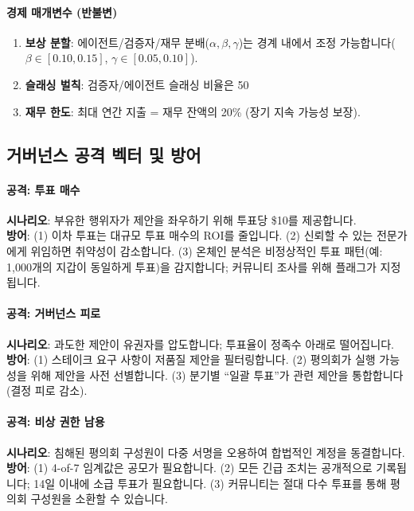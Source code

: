 \documentclass[11pt]{article}
\begin{document}
\paragraph{경제 매개변수 (반불변)}
\begin{enumerate}[noitemsep]
  \item \textbf{보상 분할}: 에이전트/검증자/재무 분배($\alpha, \beta, \gamma$)는 경계 내에서 조정 가능합니다($\beta \in [0.10, 0.15]$, $\gamma \in [0.05, 0.10]$).
  \item \textbf{슬래싱 벌칙}: 검증자/에이전트 슬래싱 비율은 50%
  \item \textbf{재무 한도}: 최대 연간 지출 = 재무 잔액의 20\% (장기 지속 가능성 보장).
\end{enumerate}

\subsection{거버넌스 공격 벡터 및 방어}

\paragraph{공격: 투표 매수}
\textbf{시나리오}: 부유한 행위자가 제안을 좌우하기 위해 투표당 \$10를 제공합니다.\\
\textbf{방어}: (1) 이차 투표는 대규모 투표 매수의 ROI를 줄입니다. (2) 신뢰할 수 있는 전문가에게 위임하면 취약성이 감소합니다. (3) 온체인 분석은 비정상적인 투표 패턴(예: 1,000개의 지갑이 동일하게 투표)을 감지합니다; 커뮤니티 조사를 위해 플래그가 지정됩니다.

\paragraph{공격: 거버넌스 피로}
\textbf{시나리오}: 과도한 제안이 유권자를 압도합니다; 투표율이 정족수 아래로 떨어집니다.\\
\textbf{방어}: (1) 스테이크 요구 사항이 저품질 제안을 필터링합니다. (2) 평의회가 실행 가능성을 위해 제안을 사전 선별합니다. (3) 분기별 ``일괄 투표''가 관련 제안을 통합합니다(결정 피로 감소).

\paragraph{공격: 비상 권한 남용}
\textbf{시나리오}: 침해된 평의회 구성원이 다중 서명을 오용하여 합법적인 계정을 동결합니다.\\
\textbf{방어}: (1) 4-of-7 임계값은 공모가 필요합니다. (2) 모든 긴급 조치는 공개적으로 기록됩니다; 14일 이내에 소급 투표가 필요합니다. (3) 커뮤니티는 절대 다수 투표를 통해 평의회 구성원을 소환할 수 있습니다.
\end{document}
